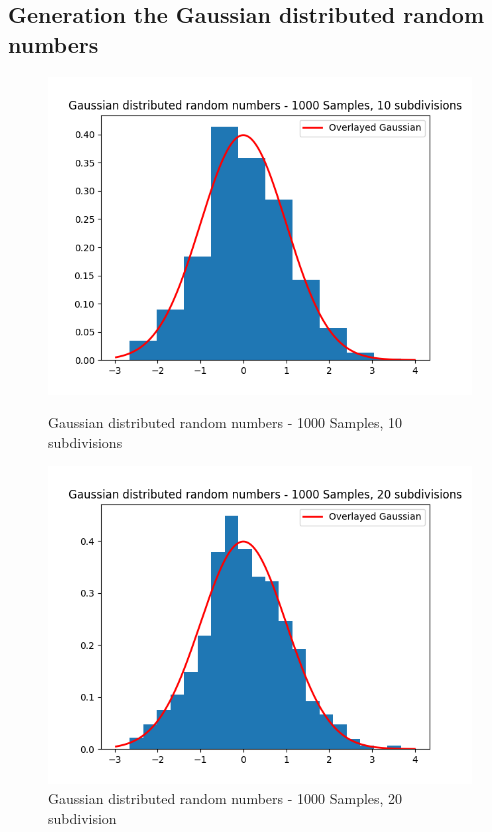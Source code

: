 \documentclass[11pt]{article}
\begin{document}
\subsection{Generation the Gaussian distributed random numbers}
\begin{figure}[H]
    \centering
    \begin{minipage}{0.48\textwidth}
        \centering
        \includegraphics[width=\textwidth]{Gaussian distributed random numbers - 1000 Samples, 10 subdivisions.png}
        \caption{Gaussian distributed random numbers - 1000 Samples, 10 subdivisions}
        \label{fig:9}
    \end{minipage}\hfill
    \begin{minipage}{0.48\textwidth}
        \centering
        \includegraphics[width=\textwidth]{Gaussian distributed random numbers - 1000 Samples, 20 subdivisions.png}
        \caption{Gaussian distributed random numbers - 1000 Samples, 20 subdivision}
        \label{fig:10}
    \end{minipage}
\end{figure}
\end{document}
